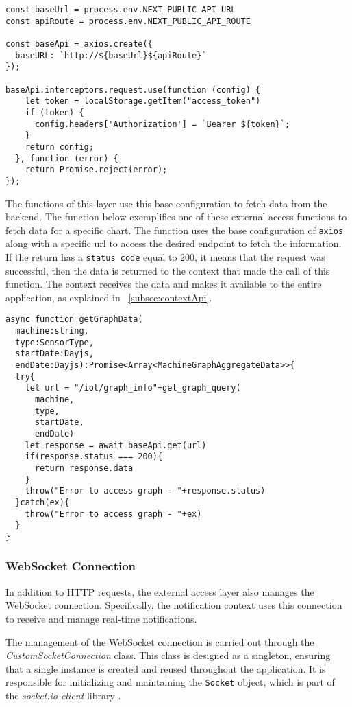 \begin{verbatim}
const baseUrl = process.env.NEXT_PUBLIC_API_URL
const apiRoute = process.env.NEXT_PUBLIC_API_ROUTE

const baseApi = axios.create({
  baseURL: `http://${baseUrl}${apiRoute}`
});

baseApi.interceptors.request.use(function (config) {
    let token = localStorage.getItem("access_token")
    if (token) {
      config.headers['Authorization'] = `Bearer ${token}`;
    }
    return config;
  }, function (error) {
    return Promise.reject(error);
});
\end{verbatim}

The functions of this layer use this base configuration to fetch data from the backend. The function below exemplifies one of these external access functions to fetch data for a specific chart. The function uses the base configuration of \texttt{axios} along with a specific url to access the desired endpoint to fetch the information. If the return has a \texttt{status code} equal to 200, it means that the request was successful, then the data is returned to the context that made the call of this function. The context receives the data and makes it available to the entire application, as explained in ~\ref{subsec:contextApi}.

\begin{verbatim}
async function getGraphData(
  machine:string,
  type:SensorType,
  startDate:Dayjs,
  endDate:Dayjs):Promise<Array<MachineGraphAggregateData>>{
  try{
    let url = "/iot/graph_info"+get_graph_query(
      machine,
      type,
      startDate,
      endDate)
    let response = await baseApi.get(url)
    if(response.status === 200){
      return response.data
    }
    throw("Error to access graph - "+response.status)
  }catch(ex){
    throw("Error to access graph - "+ex)
  }
}
\end{verbatim}


\subsubsection{WebSocket Connection}\label{subsec:websocketConncetion}
In addition to \gls{HTTP} requests, the external access layer also manages the WebSocket connection. Specifically, the notification context uses this connection to receive and manage real-time notifications.

The management of the WebSocket connection is carried out through the \textit{CustomSocketConnection} class. This class is designed as a singleton, ensuring that a single instance is created and reused throughout the application. It is responsible for initializing and maintaining the \texttt{Socket} object, which is part of the \textit{socket.io-client} library \cite{socketIoClientApi}.

